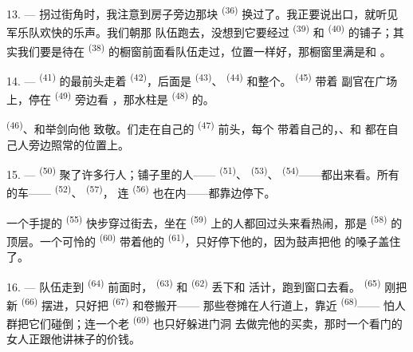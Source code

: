 13. --- 拐过街角时，我注意到房子旁边那块
\textsuperscript{(36)} 换过了。我正要说出口，就听见军乐队欢快的乐声。我们朝那
队伍跑去，没想到它要经过 \textsuperscript{(39)} 和
\textsuperscript{(40)} 的铺子；其实我们要是待在 \textsuperscript{(38)}
的橱窗前面看队伍走过，位置一样好，那橱窗里满是和
。

\VUsaut{3.0mm}

14. ---  \textsuperscript{(41)} 的最前头走着
\textsuperscript{(42)}，后面是 \textsuperscript{(43)}、
\textsuperscript{(44)} 和整个。 \textsuperscript{(45)} 带着
副官在广场上，停在 \textsuperscript{(49)} 旁边看
，那水柱是 \textsuperscript{(48)} 的。

 \textsuperscript{(46)}、和举剑向他
致敬。们走在自己的 \textsuperscript{(47)} 前头，每个
带着自己的，、和
都在自己人旁边照常的位置上。

15. ---  \textsuperscript{(50)} 聚了许多行人；铺子里的人——
 \textsuperscript{(51)}、 \textsuperscript{(53)}、
 \textsuperscript{(54)}——都出来看。所有的车——
 \textsuperscript{(52)}、 \textsuperscript{(57)}，
连 \textsuperscript{(56)} 也在内——都靠边停下。

\VUsaut{3.0mm}

一个手提的 \textsuperscript{(55)} 快步穿过街去，坐在
\textsuperscript{(59)} 上的人都回过头来看热闹，那是
\textsuperscript{(58)} 的顶层。一个可怜的 \textsuperscript{(60)} 带着他的
 \textsuperscript{(61)}，只好停下他的，因为鼓声把他
的嗓子盖住了。

16. --- 队伍走到 \textsuperscript{(64)} 前面时，
\textsuperscript{(63)} 和 \textsuperscript{(62)} 丢下和
活计，跑到窗口去看。 \textsuperscript{(65)} 刚把新
\textsuperscript{(66)} 摆进，只好把 \textsuperscript{(67)} 和卷搬开——
那些卷摊在人行道上，靠近 \textsuperscript{(68)}——
怕人群把它们碰倒；连一个老 \textsuperscript{(69)} 也只好躲进门洞
去做完他的买卖，那时一个看门的女人正跟他讲袜子的价钱。

